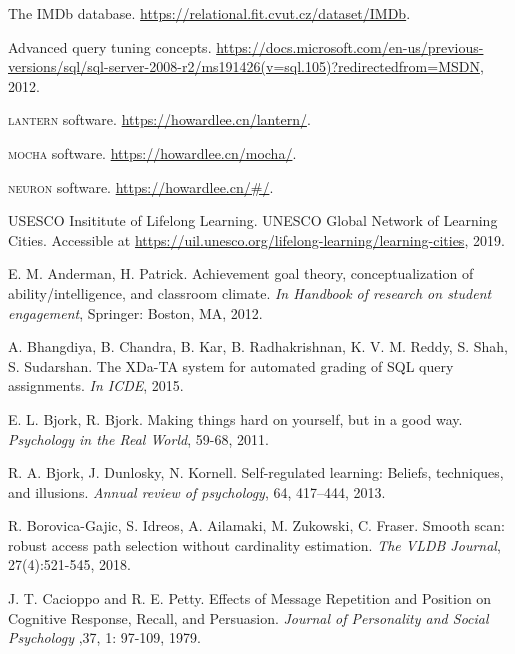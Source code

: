 \documentclass[11pt]{article}
\newcommand{\eat}[1]{}
\begin{document}
\begin{thebibliography}{10}
	\itemsep=1pt
	\begin{small}
	
	 The IMDb database. \url{https://relational.fit.cvut.cz/dataset/IMDb}.
	
	 Advanced query tuning concepts. \url{https://docs.microsoft.com/en-us/previous-versions/sql/sql-server-2008-r2/ms191426(v=sql.105)?redirectedfrom=MSDN}, 2012.
	
	 \textsc{lantern} software. \url{https://howardlee.cn/lantern/}.
	
	 \textsc{mocha} software. \url{https://howardlee.cn/mocha/}.
	
	 \textsc{neuron} software. \url{https://howardlee.cn/#/}.

 USESCO Insititute of Lifelong Learning. UNESCO Global Network of Learning Cities. Accessible at \url{https://uil.unesco.org/lifelong-learning/learning-cities}, 2019.

 E. M. Anderman, H. Patrick. Achievement goal theory, conceptualization of ability/intelligence, and classroom climate. \textit{In Handbook of research on student engagement},  Springer: Boston, MA, 2012.

 A. Bhangdiya, B. Chandra, B. Kar, B. Radhakrishnan, K. V. M. Reddy, S. Shah, S. Sudarshan.
The XDa-TA system for automated grading of SQL query assignments. \textit{In ICDE}, 2015.

 E. L. Bjork, R. Bjork.  Making things hard on yourself, but in a good way. \textit{Psychology in the Real World}, 59-68, 2011.

 R. A. Bjork, J. Dunlosky, N. Kornell. Self-regulated learning: Beliefs, techniques, and illusions. \textit{Annual review of psychology}, 64, 417–444, 2013.

 R. Borovica-Gajic, S. Idreos, A. Ailamaki, M. Zukowski, C. Fraser. Smooth scan: robust access path selection without cardinality estimation. \textit{The VLDB Journal}, 27(4):521-545, 2018.

\eat{\bibitem{BCR09} N. Bruno, S. Chaudhuri, R. Ramamurthy. Interactive plan hints for query optimization.\textit{ In SIGMOD}, 2009.}

 J. T. Cacioppo and R. E. Petty. Effects of Message Repetition and Position on Cognitive Response, Recall, and Persuasion. \textit{Journal of Personality and Social Psychology} ,37, 1: 97-109, 1979.


\end{small}
\end{thebibliography}
\end{document}

